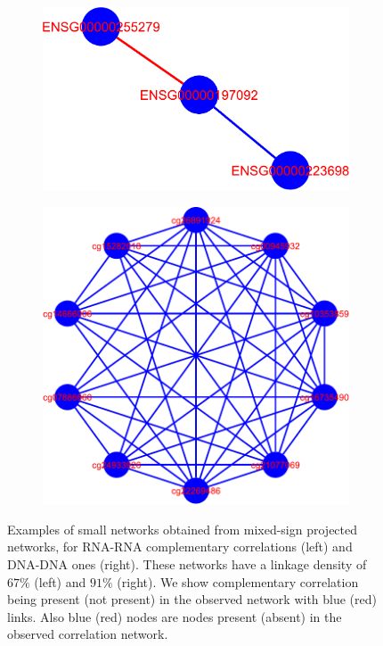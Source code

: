 \documentclass[10pt,a4paper]{article}
\begin{document}
\begin{figure}[h!]
\centering
\begin{subfigure}{0.4\textwidth}
\includegraphics[width=\textwidth]{small-RNA-mixed-CC-11.pdf}
\end{subfigure}
\hspace{5pt}
\begin{subfigure}{0.4\textwidth}
\includegraphics[width=\textwidth]{small-DNA-mixed-CC-15.pdf}
\end{subfigure}
\caption{\label{fig:mixedsmallnet} Examples of small networks obtained from mixed-sign projected networks, for RNA-RNA complementary correlations (left) and DNA-DNA ones (right). These networks have a linkage density of $67\%$ (left) and $91\%$ (right). We show complementary correlation being present (not present) in the observed network with blue (red) links. Also blue (red) nodes are nodes present (absent) in the observed correlation network.}
\end{figure}
\end{document}
